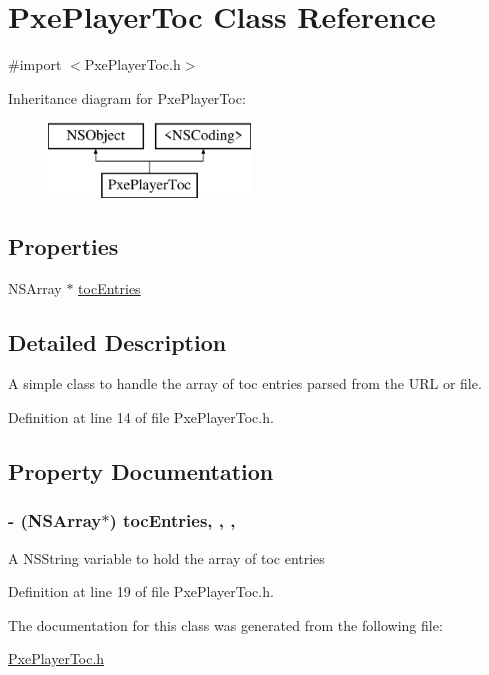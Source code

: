 \hypertarget{interface_pxe_player_toc}{\section{Pxe\-Player\-Toc Class Reference}
\label{interface_pxe_player_toc}
}


{\ttfamily \#import $<$Pxe\-Player\-Toc.\-h$>$}

Inheritance diagram for Pxe\-Player\-Toc\-:\begin{figure}[H]
\begin{center}
\leavevmode
\includegraphics[height=2.000000cm]{interface_pxe_player_toc}
\end{center}
\end{figure}
\subsection*{Properties}
\begin{DoxyCompactItemize}
\item 
N\-S\-Array $\ast$ \hyperlink{interface_pxe_player_toc_ac43471fca323aaa0e960197775177087}{toc\-Entries}
\end{DoxyCompactItemize}


\subsection{Detailed Description}
A simple class to handle the array of toc entries parsed from the U\-R\-L or file. 

Definition at line 14 of file Pxe\-Player\-Toc.\-h.



\subsection{Property Documentation}
\hypertarget{interface_pxe_player_toc_ac43471fca323aaa0e960197775177087}{
\subsubsection[{toc\-Entries}]{\setlength{\rightskip}{0pt plus 5cm}-\/ (N\-S\-Array$\ast$) toc\-Entries\hspace{0.3cm}{\ttfamily [read]}, {\ttfamily [write]}, {\ttfamily [nonatomic]}, {\ttfamily [strong]}}}\label{interface_pxe_player_toc_ac43471fca323aaa0e960197775177087}
A N\-S\-String variable to hold the array of toc entries 

Definition at line 19 of file Pxe\-Player\-Toc.\-h.



The documentation for this class was generated from the following file\-:\begin{DoxyCompactItemize}
\item 
\hyperlink{_pxe_player_toc_8h}{Pxe\-Player\-Toc.\-h}\end{DoxyCompactItemize}
